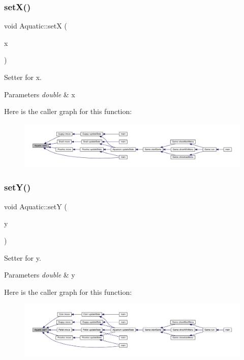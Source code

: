 \subsubsection{\texorpdfstring{set\+X()}{setX()}}
{\footnotesize\ttfamily void Aquatic\+::setX (\begin{DoxyParamCaption}\item[{double}]{x }\end{DoxyParamCaption})}



Setter for x. 


\begin{DoxyParams}{Parameters}
{\em double} & x \\
\hline
\end{DoxyParams}
Here is the caller graph for this function\+:
\nopagebreak
\begin{figure}[H]
\begin{center}
\leavevmode
\includegraphics[width=350pt]{class_aquatic_a4f5f9426805afd153c659cd0bb535ef6_icgraph}
\end{center}
\end{figure}
\mbox{\label{class_aquatic_af767ef441e7112a700975f6709b85dc9}} 
\subsubsection{\texorpdfstring{set\+Y()}{setY()}}
{\footnotesize\ttfamily void Aquatic\+::setY (\begin{DoxyParamCaption}\item[{double}]{y }\end{DoxyParamCaption})}



Setter for y. 


\begin{DoxyParams}{Parameters}
{\em double} & y \\
\hline
\end{DoxyParams}
Here is the caller graph for this function\+:
\nopagebreak
\begin{figure}[H]
\begin{center}
\leavevmode
\includegraphics[width=350pt]{class_aquatic_af767ef441e7112a700975f6709b85dc9_icgraph}
\end{center}
\end{figure}
\mbox{\label{class_aquatic_ae1b6301ed27d6aadb73c7ee7879c24af}} 
